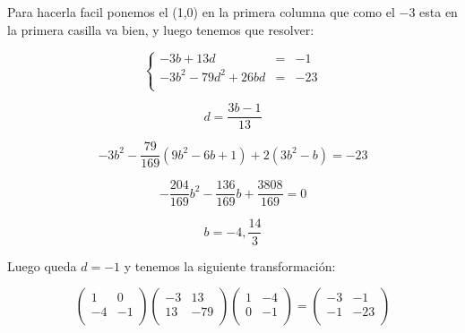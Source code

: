 \documentclass[12pt]{amsart}
\newcommand{\lp}{\left(}
\newcommand{\rp}{\right)}
\theoremstyle{plain}
\begin{document}
Para hacerla facil ponemos el (1,0) en la primera columna que
como el $-3$ esta en la primera casilla va bien, y luego 
tenemos que resolver:

$$\left\{
\begin{matrix}
    -3b+13d &=&-1 \\
    -3b^2-79d^2+26bd &=&-23 \\
\end{matrix}\right.$$

$$d=\frac{3b-1}{13}$$

$$-3b^2-\frac{79}{169}(9b^2-6b+1)+2(3b^2-b)=-23$$

$$-\frac{204}{169}b^2-\frac{136}{169}b+\frac{3808}{169}=0$$

$$b=-4, \frac{14}{3}$$

Luego queda $d=-1$ y tenemos la siguiente transformación:

$$\lp\begin{matrix}
    1&0 \\
    -4&-1 \\
\end{matrix}\rp
\lp\begin{matrix}
    -3&13 \\
    13&-79 \\
\end{matrix}\rp
\lp\begin{matrix}
    1&-4 \\
    0&-1 \\
\end{matrix}\rp = 
\lp\begin{matrix}
    -3&-1 \\
    -1&-23 \\
\end{matrix}\rp$$
\end{document}
